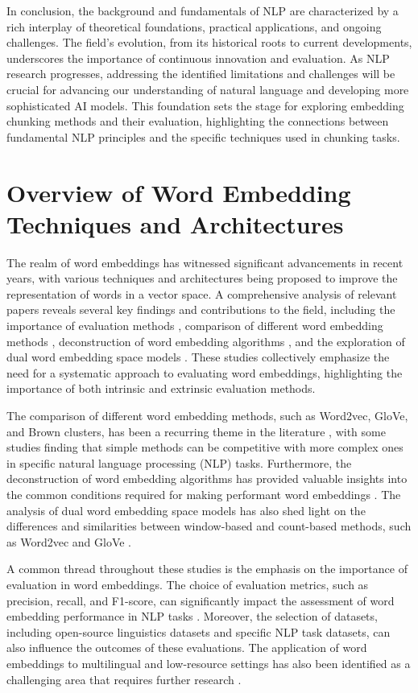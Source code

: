 \documentclass[conference]{IEEEtran}
\begin{document}
In conclusion, the background and fundamentals of NLP are characterized by a rich interplay of theoretical foundations, practical applications, and ongoing challenges. The field's evolution, from its historical roots to current developments, underscores the importance of continuous innovation and evaluation. As NLP research progresses, addressing the identified limitations and challenges will be crucial for advancing our understanding of natural language and developing more sophisticated AI models. This foundation sets the stage for exploring embedding chunking methods and their evaluation, highlighting the connections between fundamental NLP principles and the specific techniques used in chunking tasks.

\section{Overview of Word Embedding Techniques and Architectures}
The realm of word embeddings has witnessed significant advancements in recent years, with various techniques and architectures being proposed to improve the representation of words in a vector space. A comprehensive analysis of relevant papers reveals several key findings and contributions to the field, including the importance of evaluation methods \cite{a1}, comparison of different word embedding methods \cite{b2}, deconstruction of word embedding algorithms \cite{c3}, and the exploration of dual word embedding space models \cite{d4}. These studies collectively emphasize the need for a systematic approach to evaluating word embeddings, highlighting the importance of both intrinsic and extrinsic evaluation methods.

The comparison of different word embedding methods, such as Word2vec, GloVe, and Brown clusters, has been a recurring theme in the literature \cite{b2}, with some studies finding that simple methods can be competitive with more complex ones in specific natural language processing (NLP) tasks. Furthermore, the deconstruction of word embedding algorithms has provided valuable insights into the common conditions required for making performant word embeddings \cite{c3}. The analysis of dual word embedding space models has also shed light on the differences and similarities between window-based and count-based methods, such as Word2vec and GloVe \cite{d4}.

A common thread throughout these studies is the emphasis on the importance of evaluation in word embeddings. The choice of evaluation metrics, such as precision, recall, and F1-score, can significantly impact the assessment of word embedding performance in NLP tasks \cite{a1}. Moreover, the selection of datasets, including open-source linguistics datasets and specific NLP task datasets, can also influence the outcomes of these evaluations. The application of word embeddings to multilingual and low-resource settings has also been identified as a challenging area that requires further research \cite{e5}.
\end{document}
